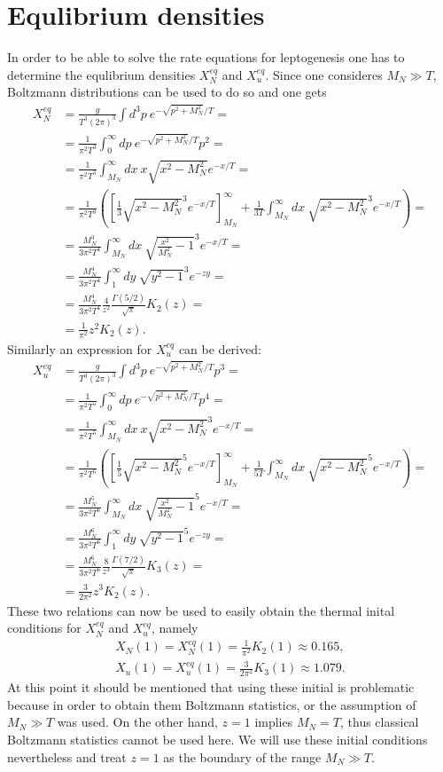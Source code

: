 \section{Equlibrium densities}
\label{ap:equlibrium}
In order to be able to solve the rate equations for leptogenesis one has to determine the equlibrium densities $X_N^{eq}$ and $X_u^{eq}$. Since one consideres $M_N\gg T$, Boltzmann distributions can be used to do so and one gets
\begin{align*}
	X_N^{eq}&=\frac{g}{T^3(2\pi)^3}\int d^3p \:e^{-\sqrt{p^2+M_N^2}/T}=\\
	&=\frac{1}{\pi^2T^3}\int_0^\infty dp \:e^{-\sqrt{p^2+M_N^2}/T}p^2=\\
	&=\frac{1}{\pi^2T^3}\int_{M_N}^\infty dx \:x\sqrt{x^2-M_N^2}e^{-x/T}=\\
	&=\frac{1}{\pi^2T^3}\left(\left[\frac{1}{3}\sqrt{x^2-M_N^2}^3e^{-x/T}\right]_{M_N}^\infty+\frac{1}{3T}\int_{M_N}^{\infty}dx\:\sqrt{x^2-M_N^2}^3e^{-x/T}\right)=\\
	&=\frac{M_N^3}{3\pi^2T^4}\int_{M_N}^{\infty}dx\:\sqrt{\frac{x^2}{M_N^2}-1}^3e^{-x/T}=\\
	&=\frac{M_N^4}{3\pi^2T^4}\int_{1}^{\infty}dy\:\sqrt{y^2-1}^3e^{-zy}=\\
	&=\frac{M_N^4}{3\pi^2T^4}\frac{4}{z^2}\frac{\Gamma(5/2)}{\sqrt{\pi}}K_2(z)=\\
	&=\frac{1}{\pi^2}z^2K_2(z).
\end{align*}
Similarly an expression for $X_u^{eq}$ can be derived:
\begin{align*}
X_u^{eq}&=\frac{g}{T^3(2\pi)^3}\int d^3p \:e^{-\sqrt{p^2+M_N^2}/T}p^3=\\
&=\frac{1}{\pi^2T^5}\int_0^\infty dp \:e^{-\sqrt{p^2+M_N^2}/T}p^4=\\
&=\frac{1}{\pi^2T^5}\int_{M_N}^\infty dx \:x\sqrt{x^2-M_N^2}^3e^{-x/T}=\\
&=\frac{1}{\pi^2T^5}\left(\left[\frac{1}{5}\sqrt{x^2-M_N^2}^5e^{-x/T}\right]_{M_N}^\infty+\frac{1}{5T}\int_{M_N}^{\infty}dx\:\sqrt{x^2-M_N^2}^5e^{-x/T}\right)=\\
&=\frac{M_N^5}{3\pi^2T^6}\int_{M_N}^{\infty}dx\:\sqrt{\frac{x^2}{M_N^2}-1}^5e^{-x/T}=\\
&=\frac{M_N^6}{3\pi^2T^6}\int_{1}^{\infty}dy\:\sqrt{y^2-1}^5e^{-zy}=\\
&=\frac{M_N^6}{3\pi^2T^6}\frac{8}{z^3}\frac{\Gamma(7/2)}{\sqrt{\pi}}K_3(z)=\\
&=\frac{3}{2\pi^2}z^3K_2(z).
\end{align*}
These two relations can now be used to easily obtain the thermal inital conditions for $X_N^{eq}$ and $X_u^{eq}$, namely
\begin{align*}
	X_N(1)=X_N^{eq}(1)=\frac{1}{\pi^2}K_2(1)\approx 0.165,\\
	X_u(1)=X_u^{eq}(1)=\frac{3}{2\pi^2}K_3(1)\approx 1.079.
\end{align*}
At this point it should be mentioned that using these initial is problematic because in order to obtain them Boltzmann statistics, or the assumption of $M_N\gg T$ was used. On the other hand, $z=1$ implies $M_N=T$, thus classical Boltzmann statistics cannot be used here. We will use these initial conditions nevertheless and treat $z=1$ as the boundary of the range $M_N\gg T$.
